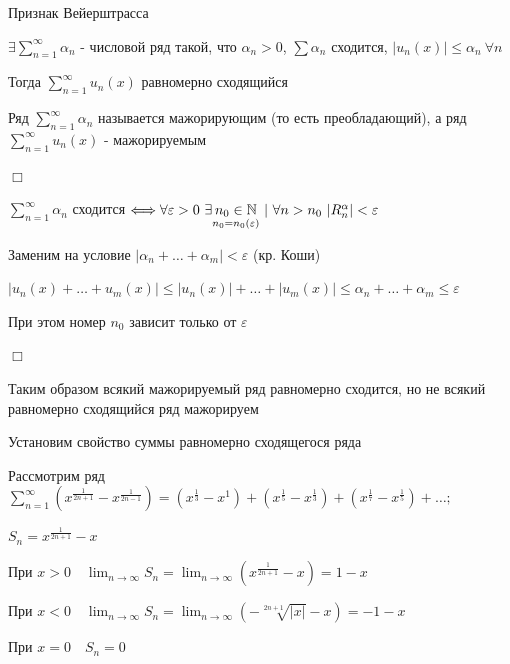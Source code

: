\documentclass[12pt]{article}
\begin{document}
    \begin{MyTheorem}
        \Ths Признак Вейерштрасса

        $\exists \sum_{n = 1}^\infty \alpha_n$ - числовой ряд такой, что $\alpha_n > 0$, $\sum \alpha_n$ сходится,
        $|u_n(x)| \leq \alpha_n \ \forall n$

        Тогда $\sum_{n = 1}^\infty u_n(x)$ равномерно сходящийся

    \end{MyTheorem}

    \Nota Ряд $\sum_{n = 1}^\infty \alpha_n$ называется мажорирующим (то есть преобладающий), 
    а ряд $\sum_{n = 1}^\infty u_n(x)$ - мажорируемым

    \begin{MyProof}
        $\Box$

        $\sum_{n = 1}^\infty \alpha_n$ сходится $\Longleftrightarrow \forall \varepsilon > 0 \ \exists \underset{n_0 = n_0(\varepsilon)}{n_0 \in \mathbb{N}} \ | \
        \forall n > n_0 \ |R_n^\alpha| < \varepsilon$

        Заменим на условие $|\alpha_n + \dots + \alpha_m| < \varepsilon$ (кр. Коши)

        $|u_n(x) + \dots + u_m(x)| \leq |u_n(x)| + \dots + |u_m(x)| \leq \alpha_n + \dots + \alpha_m \leq \varepsilon$

        При этом номер $n_0$ зависит только от $\varepsilon$

        $\Box$
    \end{MyProof}

    \Nota Таким образом всякий мажорируемый ряд равномерно сходится, но не всякий равномерно сходящийся ряд мажорируем

    \Nota Установим свойство суммы равномерно сходящегося ряда

    \Exs Рассмотрим ряд $\sum_{n = 1}^\infty (x^{\frac{1}{2n + 1}} - x^{\frac{1}{2n - 1}}) = (x^\frac{1}{3} - x^1) + (x^\frac{1}{5} - x^\frac{1}{3}) + (x^\frac{1}{7} - x^\frac{1}{5}) + \dots;$

    $S_n = x^\frac{1}{2n + 1} - x$

    При $x > 0 \quad \lim_{n \to \infty} S_n = \lim_{n \to \infty} (x^\frac{1}{2n + 1} - x) = 1 - x$

    При $x < 0 \quad \lim_{n \to \infty} S_n = \lim_{n \to \infty} (-\sqrt[2n + 1]{|x|} - x) = -1 - x$

    При $x = 0 \quad S_n = 0$

\end{document}
